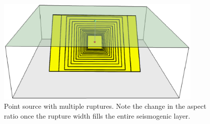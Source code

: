 \begin{figure}[ht!]
\centering
\includegraphics[width=10cm]{./figures/hazard/point_source_multiple_ruptures.ps}
\caption{Point source with multiple ruptures. Note the change in the aspect 
ratio once the rupture width fills the entire seismogenic layer.}
\label{fig:point_source_multiple_ruptures}
\end{figure}

